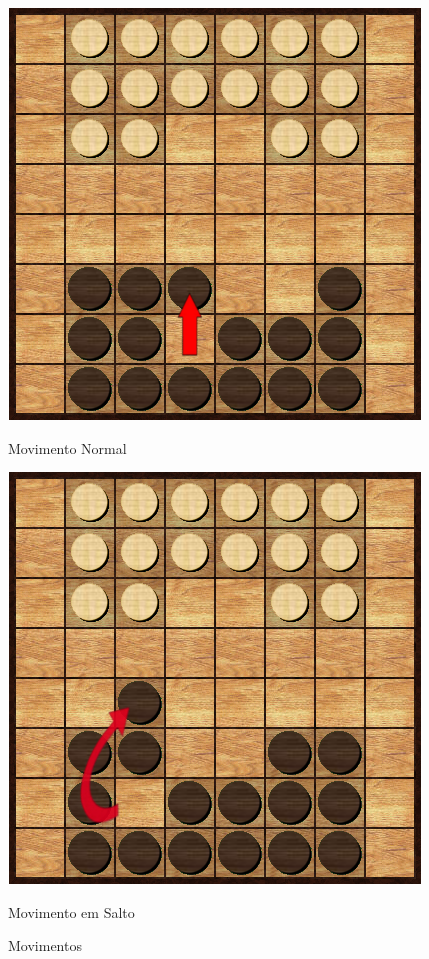 \documentclass[a4paper]{article}
\begin{document}
\begin{figure}[h!]
  \begin{minipage}[h!]{0.3\textwidth}
    \includegraphics[width=\textwidth]{res/normalMove.png}
    \caption{Movimento Normal}
    \label{fig:5}
  \end{minipage}
\quad\quad\quad\quad\quad\quad\quad\quad
  \begin{minipage}[h!]{0.3\textwidth}
    \includegraphics[width=\textwidth]{res/jumpMove.png}
    \caption{Movimento em Salto}
    \label{fig:6}
  \end{minipage}
  \caption{Movimentos}
\end{figure}
\end{document}
